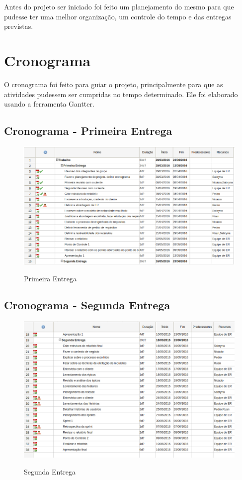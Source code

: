 Antes do projeto ser iniciado foi feito um planejamento do mesmo para que pudesse ter uma melhor organização, um controle do tempo e das entregas previstas.

\section{Cronograma}

O cronograma foi feito para guiar o projeto, principalmente para que as atividades pudessem ser cumpridas no tempo determinado. Ele foi elaborado usando a ferramenta Gantter.

\subsection{Cronograma - Primeira Entrega}

\FloatBarrier
\begin{figure}[!htpd]
		\centering
		\caption{Primeira Entrega}
		\includegraphics[scale=0.27]{figuras/cron1}
		\label{img:Cronograma - Primeira Entrega}
\end{figure}
\FloatBarrier

\subsection{Cronograma - Segunda Entrega}

\FloatBarrier
\begin{figure}[!htpd]
		\centering
		\caption{Segunda Entrega}
		\includegraphics[scale=0.27]{figuras/cron2}
		\label{img:Cronograma - Segunda Entrega}
\end{figure}
\FloatBarrier
